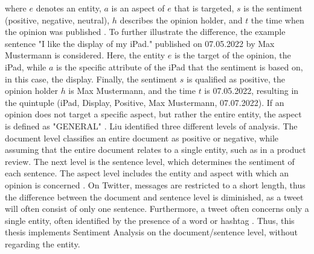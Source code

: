where $e$ denotes an entity, $a$ is an aspect of $e$ that is targeted, $s$ is the sentiment (positive, negative, neutral), $h$ describes the opinion holder, and $t$ the time when the opinion was published \cite{liu_2015}. To further illustrate the difference, the example sentence "I like the display of my iPad." published on 07.05.2022 by Max Mustermann is considered. Here, the entity $e$ is the target of the opinion, the iPad, while $a$ is the specific attribute of the iPad that the sentiment is based on, in this case, the display. Finally, the sentiment $s$ is qualified as positive, the opinion holder $h$ is Max Mustermann, and the time $t$ is 07.05.2022, resulting in the quintuple (iPad, Display, Positive, Max Mustermann, 07.07.2022). If an opinion does not target a specific aspect, but rather the entire entity, the aspect is defined as "GENERAL" \cite{liu_2015}. Liu identified three different levels of analysis. The document level classifies an entire document as positive or negative, while assuming that the entire document relates to a single entity, such as in a product review. The next level is the sentence level, which determines the sentiment of each sentence. The aspect level includes the entity and aspect with which an opinion is concerned \cite{liu_2015}. On Twitter, messages are restricted to a short length, thus the difference between the document and sentence level is diminished, as a tweet will often consist of only one sentence. Furthermore, a tweet often concerns only a single entity, often identified by the presence of a word or hashtag \cite{DBLP:journals/csur/GiachanouC16}. Thus, this thesis implements Sentiment Analysis on the document/sentence level, without regarding the entity.

